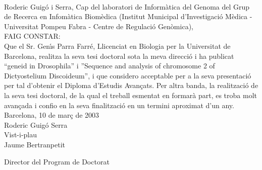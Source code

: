 \documentclass[a4paper,12pt]{article}
\begin{document}
\ \\[8ex]
Roderic Guig\'o i Serra, Cap del laboratori de Inform\`atica del Genoma del Grup de Recerca en Infom\`atica Biom\`edica (Institut Municipal d'Investigaci\'o M\`edica - Universitat Pompeu Fabra - Centre de Regulaci\'o Gen\`omica),\\[10ex] 


FAIG CONSTAR:\\[3ex] 

Que el Sr. Gen\'{\i}s Parra Farr\'e, Llicenciat en Biologia per la
Universitat de Barcelona, realitza la seva tesi doctoral sota la meva
direcci\'o i ha publicat ``geneid in Drosophila'' i ''Sequence and
analysis of chromosome 2 of Dictyostelium Discoideum'', i que
considero acceptable per a la seva presentaci\'o per tal d'obtenir el
Diploma d'Estudis Avan\c{c}ats. Per altra banda, la realitzaci\'o de la
seva tesi doctoral, de la qual el treball esmentat en formar\`a part,
es troba molt avan\c{c}ada i confio en la seva finalitzaci\'o en un
termini aproximat d'un any. \\[5ex]


Barcelona, 10 de mar\c{c} de 2003\\[10ex]

Roderic Guig\'o Serra\\[1ex]






Vist-i-plau\\[10ex]




Jaume Bertranpetit

Director del Program de Doctorat
\end{document}
